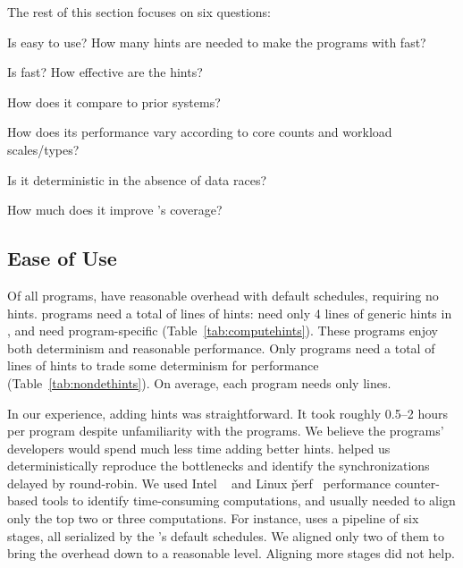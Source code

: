 The rest of this section focuses on six questions:
\begin{tightenum}

\item[\S\ref{sec:ease-of-use}:] Is \xxx easy to use?  How many hints are
  needed to make the programs with \xxx fast?

\item[\S\ref{sec:performance}:] Is \xxx fast?  How effective are the
  hints?

\item[\S\ref{sec:comparison}:] How does it compare to prior systems?

\item[\S\ref{sec:sensitivity}:] How does its performance vary according
  to core counts and workload scales/types?

\item[\S\ref{sec:determinism}:] Is it deterministic in the absence of data races?

\item[\S\ref{sec:coverage}:] How much does it improve \dbug's coverage?

\end{tightenum}

\subsection{Ease of Use} \label{sec:ease-of-use}

Of all \nprog programs, \nprognohints have reasonable overhead with
default schedules, requiring no hints.  \nproglineuphints programs need a total of 
\nlineofcomputehints lines of \compute hints: \nproggenericlineuphints
need only 4 lines of generic \compute hints in \libgomp, and
\nprogspecificlineuphints need program-specific \computes
(Table~\ref{tab:computehints}).  These programs enjoy both determinism and
reasonable performance.  Only \nprognondethints programs 
need a total of \nlineofnondethints lines of \nondet hints to
trade some determinism for performance (Table~\ref{tab:nondethints}).
On average, each program needs only \hintsperprog lines.

In our experience, adding hints was straightforward.  It took roughly 0.5--2 hours per
program despite unfamiliarity with the programs.  We believe
the programs' developers would spend much less time adding better hints.
\xxx helped us deterministically reproduce the bottlenecks and identify
the synchronizations delayed by round-robin.  We used Intel \vtune~\cite{vtune} and
Linux \v{perf}~\cite{perf} performance counter-based tools to identify time-consuming
computations, and usually needed to align only the top two or three
computations.  For instance, \ferret uses a pipeline of six stages, all
serialized by the \xxx's default schedules.  We aligned only two of them to bring
the overhead down to a reasonable level.  Aligning more stages did not help.


